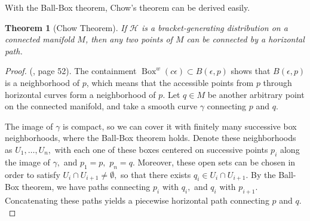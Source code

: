 \documentclass[12pt, letterpaper, reqno]{amsart}
\theoremstyle{definition}
\theoremstyle{plain}
\newtheorem{thm}{Theorem}
\theoremstyle{remark}
\begin{document}
With the Ball-Box theorem, Chow's theorem can be derived easily.

\begin{thm}[Chow Theorem]
	If $ \mathcal{H} $ is a bracket-generating distribution on a connected manifold $ M $, then any two points of $ M $ can be connected by a horizontal path.
\end{thm}
\begin{proof} (\cite{montgomery2002tour}, page 52). The containment $ \operatorname{Box}^w(c\epsilon) \subset B(\epsilon,p)$ shows that $ B(\epsilon, p) $ is a neighborhood of $ p $, which means that the accessible points from $ p $ through horizontal curves form a neighborhood of $ p. $ Let $ q\in M $ be another arbitrary point on the connected manifold, and take a smooth curve $ \gamma $ connecting $ p $ and $ q. $  

	The image of $ \gamma $ is compact, so we can cover it with finitely many successive box neighborhoods, where the Ball-Box theorem holds. Denote these neighborhoods as $ U_1,\dots,U_n, $ with each one of these boxes centered on successive points $ p_i $ along the image of $ \gamma, $ and $ p_1=p, $ $ p_n=q. $ Moreover, these open sets can be chosen in order to satisfy $ U_i\cap U_{i+1}\neq\emptyset, $ so that there exists $ q_i \in U_i\cap U_{i+1}. $ By the Ball-Box theorem, we have paths connecting $ p_i $ with $ q_i, $ and $ q_i $ with $ p_{i+1}. $ Concatenating these paths yields a piecewise horizontal path connecting $ p $ and $ q. $ 
	
\end{proof}
\end{document}
